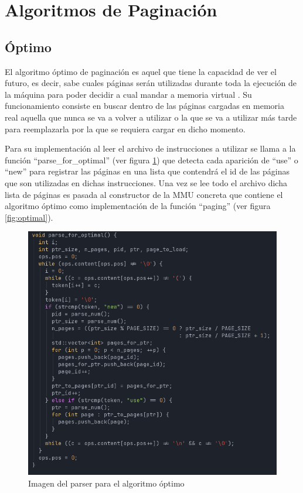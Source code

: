 \documentclass{report}
\begin{document}
\section {Algoritmos de Paginación}

\subsection{Óptimo}
El algoritmo óptimo de paginación es aquel que tiene la capacidad de ver el futuro, es decir, sabe cuales páginas serán utilizadas durante toda la ejecución de la máquina para poder decidir a cual mandar a memoria virtual \cite{ref0}. 
Su funcionamiento consiste en buscar dentro de las páginas cargadas en memoria real aquella que nunca se va a volver a utilizar o la que se va a utilizar más tarde para reemplazarla por la que se requiera cargar en dicho momento. 

Para su implementación al leer el archivo de instrucciones a utilizar se llama a la función ``parse\_for\_optimal'' (ver figura \ref{fig:parse_optimal}) que detecta cada aparición de ``use'' o ``new'' para registrar las páginas en una lista que contendrá el id de las páginas que son utilizadas en dichas instrucciones. Una vez se lee todo el archivo dicha lista de páginas es pasada al constructor de la MMU concreta que contiene el algoritmo óptimo como implementación de la función ``paging'' (ver figura \ref{fig:optimal}).

\begin{figure}[h]
	\centering
	\includegraphics[width=0.8\linewidth]{figuras/parse_optimal.png}
	\caption{Imagen del parser para el algoritmo óptimo}
	\label{fig:parse_optimal}
\end{figure}
\end{document}
